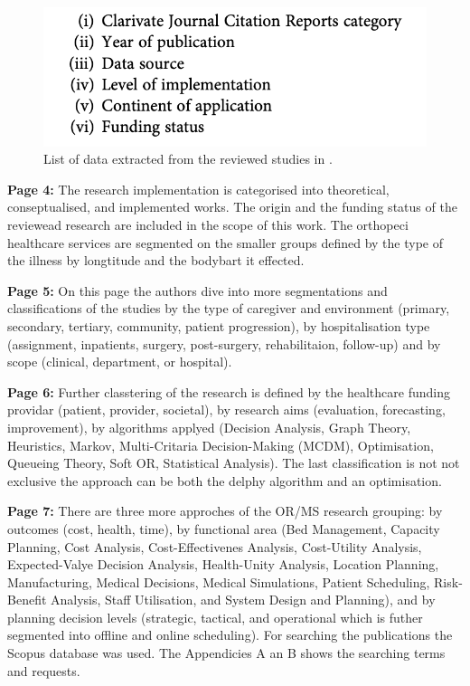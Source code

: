     \begin{figure}[H]
        \centering
        \includegraphics[width=.8\textwidth]{figures/0005_SR02GB23/fig1.png}
        \caption{List of data extracted from the reviewed studies in \cite{x122}.}
        \label{fig1:SR02GB23}
    \end{figure}
    
    \textbf{Page 4:}
    The research implementation is categorised into theoretical, conseptualised, and implemented works. The origin and the funding status of the reviewead research are included in the scope of this work. The orthopeci healthcare services are segmented on the smaller groups defined by the type of the illness by longtitude and the bodybart it effected.
    
    \textbf{Page 5:}
    On this page the authors dive into more segmentations and classifications of the studies by the type of caregiver and environment (primary, secondary, tertiary, community, patient progression), by hospitalisation type (assignment, inpatients, surgery, post-surgery, rehabilitaion, follow-up) and by scope (clinical, department, or hospital). 
   
    \textbf{Page 6:}
    Further classtering of the research is defined by the healthcare funding providar (patient, provider, societal), by research aims (evaluation, forecasting, improvement), by algorithms applyed (Decision Analysis, Graph Theory, Heuristics, Markov, Multi-Critaria Decision-Making (MCDM), Optimisation, Queueing Theory, Soft OR, Statistical Analysis). The last classification is not not exclusive the approach can be both the delphy algorithm and an optimisation.
    
    \textbf{Page 7:}
    There are three more approches of the OR/MS research grouping: by outcomes (cost, health, time), by functional area (Bed Management, Capacity Planning, Cost Analysis, Cost-Effectivenes Analysis, Cost-Utility Analysis, Expected-Valye Decision Analysis, Health-Unity Analysis, Location Planning, Manufacturing, Medical Decisions, Medical Simulations, Patient Scheduling, Risk-Benefit Analysis, Staff Utilisation, and System Design and Planning), and by planning decision levels (strategic, tactical, and operational which is futher segmented into offline and online scheduling). 
    For searching the publications the Scopus database was used. The Appendicies A an B shows the searching terms and requests.
    
